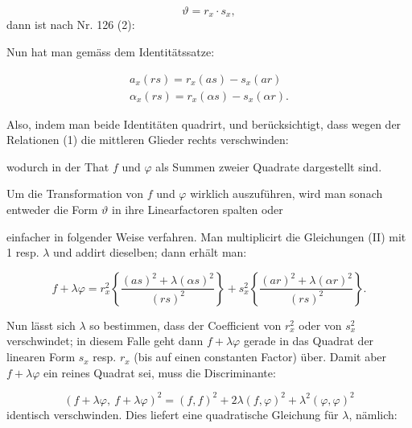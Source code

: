 \[
\vartheta = r_x \cdot s_x,
\]
dann ist nach Nr. 126 (2):


Nun hat man gemäss dem Identitätssatze:

\[
\begin{gathered}
a_x(rs) = r_x(as) - s_x(ar)\\
\alpha_x(rs) = r_x(\alpha s) - s_x(\alpha r).
\end{gathered}
\]

Also, indem man beide Identitäten quadrirt, und berücksichtigt, dass wegen der
Relationen (1) die mittleren Glieder rechts verschwinden:


wodurch in der That $f$ und $\varphi$ als Summen zweier Quadrate dargestellt sind.

Um die Transformation von $f$ und $\varphi$ wirklich auszuführen, wird man sonach
entweder die Form $\vartheta$ in ihre Linearfactoren spalten oder


einfacher in folgender Weise verfahren. Man multiplicirt die Gleichungen (II) mit
1 resp. $\lambda$ und addirt dieselben; dann erhält man:

\[
f + \lambda\varphi = r_x^2\left\{\frac{(as)^2+\lambda(\alpha s)^2}{(rs)^2}\right\} + s_x^2\left\{\frac{(ar)^2+\lambda(\alpha r)^2}{(rs)^2}\right\}.
\]

Nun lässt sich $\lambda$ so bestimmen, dass der Coefficient von $r_x^2$ oder von
$s_x^2$ verschwindet; in diesem Falle geht dann $f+\lambda\varphi$ gerade in das
Quadrat der linearen Form $s_x$ resp. $r_x$ (bis auf einen constanten Factor) über.
Damit aber $f+\lambda\varphi$ ein reines Quadrat sei, muss die Discriminante:

\[
(f+\lambda\varphi,\ f+\lambda\varphi)^2 = (f,f)^2 + 2\lambda(f,\varphi)^2 + \lambda^2(\varphi,\varphi)^2
\]
identisch verschwinden. Dies liefert eine quadratische Gleichung für $\lambda$,
nämlich:

